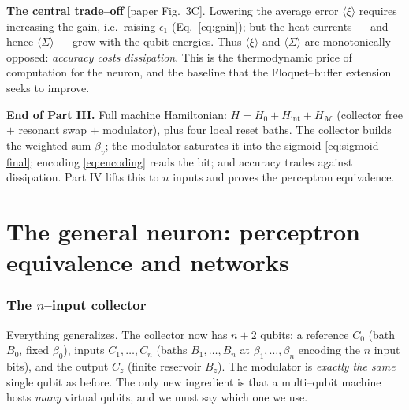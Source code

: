 \documentclass[11pt,a4paper]{article}
\newcommand{\calM}{\mathcal{M}}
\theoremstyle{definition}
\theoremstyle{remark}
\begin{document}
\begin{keybox}
\textbf{The central trade--off} [paper Fig.~3C]. Lowering the average
error $\langle\xi\rangle$ requires increasing the gain, i.e.\ raising
$\epsilon_1$ (Eq.~\eqref{eq:gain}); but the heat currents --- and hence
$\langle\Sigma\rangle$ --- grow with the qubit energies. Thus
$\langle\xi\rangle$ and $\langle\Sigma\rangle$ are monotonically
opposed: \emph{accuracy costs dissipation}. This is the thermodynamic
price of computation for the neuron, and the baseline that the
Floquet--buffer extension seeks to improve.
\end{keybox}

\begin{keybox}
\textbf{End of Part III.} Full machine Hamiltonian:
$H=H_0+H_{\mathrm{int}}+H_\calM$ (collector free $+$ resonant swap $+$
modulator), plus four local reset baths. The collector builds the
weighted sum $\beta_v$; the modulator saturates it into the sigmoid
\eqref{eq:sigmoid-final}; encoding \eqref{eq:encoding} reads the bit; and
accuracy trades against dissipation. Part IV lifts this to $n$ inputs and
proves the perceptron equivalence.
\end{keybox}

\part{The general neuron: perceptron equivalence and networks}
\label{part:general}

\section{The $n$--input collector}
\label{sec:n-collector}
Everything generalizes. The collector now has $n+2$ qubits: a reference
$C_0$ (bath $B_0$, fixed $\beta_0$), inputs $C_1,\dots,C_n$ (baths
$B_1,\dots,B_n$ at $\beta_1,\dots,\beta_n$ encoding the $n$ input bits),
and the output $C_z$ (finite reservoir $B_z$). The modulator is
\emph{exactly the same} single qubit as before. The only new ingredient
is that a multi--qubit machine hosts \emph{many} virtual qubits, and we
must say which one we use.
\end{document}
